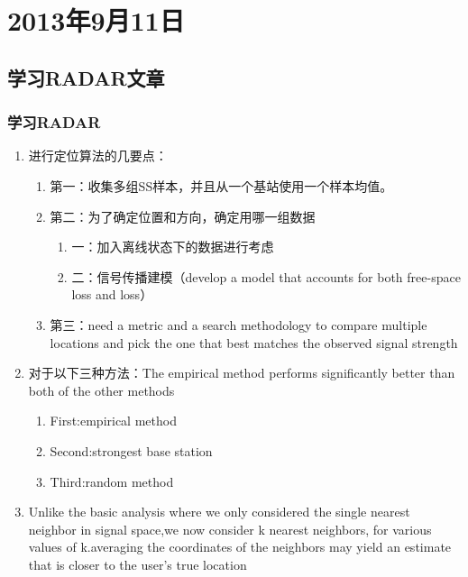 \chapter{2013年9月11日}
\section{学习RADAR文章}
\subsection{学习RADAR}
\begin{enumerate}
    \item
    进行定位算法的几要点：
    \begin{enumerate}
    \item
    第一：收集多组SS样本，并且从一个基站使用一个样本均值。
    \item
    第二：为了确定位置和方向，确定用哪一组数据
    \begin{enumerate}
    \item
    一：加入离线状态下的数据进行考虑
    \item
    二：信号传播建模（develop a model that accounts for both free-space loss and loss）
    \end{enumerate}
    \item
     第三：need a metric and a search methodology to compare multiple locations and pick the one that best matches the observed signal strength
    \end{enumerate}
    \item
    对于以下三种方法：The empirical method performs significantly better than both of the other methods
    \begin{enumerate}
    \item
    First:empirical method
    \item
    Second:strongest base station
    \item
    Third:random method
    \end{enumerate}
    \item
    Unlike the basic analysis where we only considered the single nearest neighbor in signal space,we now consider k nearest neighbors, for various values of k.averaging the coordinates of the neighbors may yield an estimate that is closer to the user’s true location
\end{enumerate}